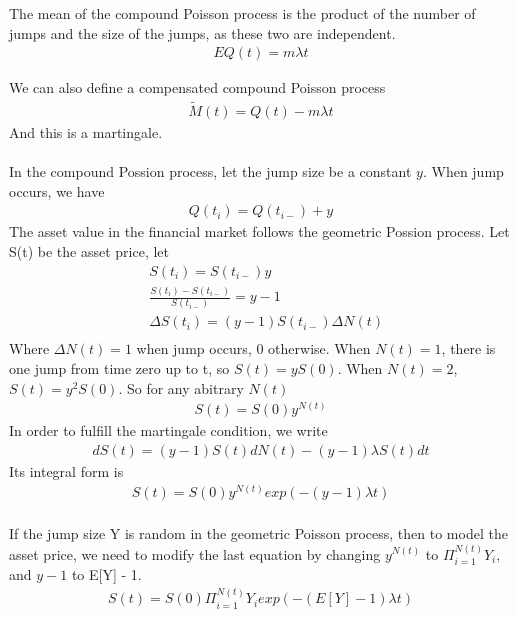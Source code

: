 \documentclass[a4paper]{article}
\begin{document}
The mean of the compound Poisson process is the product of the number of jumps and the size of the jumps, as these two are independent.
\begin{align*}
	EQ(t) = m \lambda t
\end{align*}

We can also define a compensated compound Poisson process
\begin{align*}
	\tilde M(t) = Q(t) - m \lambda t
\end{align*}
And this is a martingale.\\

\\
In the compound Possion process, let the jump size be a constant $y$. When jump occurs, we have 
\begin{align*}
	Q(t_i) = Q(t_{i-}) + y 
\end{align*}
The asset value in the financial market follows the geometric Possion process. Let S(t) be the asset price, let
\begin{align*}
	& S(t_i) = S(t_{i-}) y \\
	& \frac{S(t_i) - S(t_{i-})}{S(t_{i-})} =  y - 1 \\
	&  \Delta S(t_i) =  (y - 1) S(t_{i-}) \Delta N(t)  \\
\end{align*}
Where $\Delta N(t) = 1$ when jump occurs, $0$ otherwise. When $N(t) = 1$, there is one jump from time zero up to t, so $S(t) = yS(0)$. When $N(t) = 2$, $S(t) = y^2 S(0)$. So for any abitrary $N(t)$
\begin{align*}
	S(t) = S(0)y^{N(t)} 
\end{align*}
In order to fulfill the martingale condition, we write
\begin{align*}
	dS(t) = (y - 1)S(t) dN(t) - (y - 1) \lambda S(t) dt
\end{align*}
Its integral form is
\begin{align*}
	S(t) = S(0)y^{N(t)} exp(- (y - 1) \lambda t) 
\end{align*}
\\
If the jump size Y is random in the geometric Poisson process, then to model the asset price, we need to modify
the last equation by changing $y^{N(t)}$ to $\Pi_{i=1}^{N(t)} Y_i$, and $y - 1$ to E[Y] - 1. 
\begin{align*}
	S(t) = S(0)\Pi_{i=1}^{N(t)} Y_i exp(- (E[Y] - 1) \lambda t) 
\end{align*}
\end{document}
